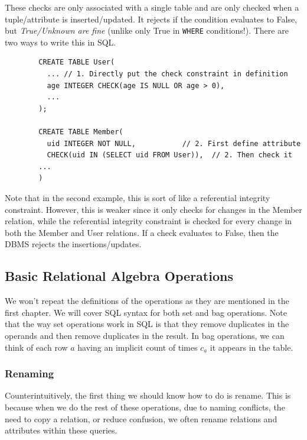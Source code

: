     \begin{definition}
      These checks are only associated with a single table and are only checked when a tuple/attribute is inserted/updated. It rejects if the condition evaluates to False, but \textit{True/Unknown are fine} (unlike only True in \texttt{WHERE} conditions!). There are two ways to write this in SQL. 
      \begin{lstlisting}
        CREATE TABLE User(
          ... // 1. Directly put the check constraint in definition
          age INTEGER CHECK(age IS NULL OR age > 0), 
          ...
        ); 

        CREATE TABLE Member(
          uid INTEGER NOT NULL,           // 2. First define attribute 
          CHECK(uid IN (SELECT uid FROM User)),  // 2. Then check it 
        ...
        )
      \end{lstlisting}
      Note that in the second example, this is sort of like a referential integrity constraint. However, this is weaker since it only checks for changes in the Member relation, while the referential integrity constraint is checked for every change in both the Member and User relations. If a check evaluates to False, then the DBMS rejects the insertions/updates. 
    \end{definition}

\subsection{Basic Relational Algebra Operations} 

  We won't repeat the definitions of the operations as they are mentioned in the first chapter. We will cover SQL syntax for both set and bag operations. Note that the way set operations work in SQL is that they remove duplicates in the operands and then remove duplicates in the result. In bag operations, we can think of each row $a$ having an implicit count of times $c_a$ it appears in the table.  

  \subsubsection{Renaming}
    
    Counterintuitively, the first thing we should know how to do is rename. This is because when we do the rest of these operations, due to naming conflicts, the need to copy a relation, or reduce confusion, we often rename relations and attributes within these queries. 

